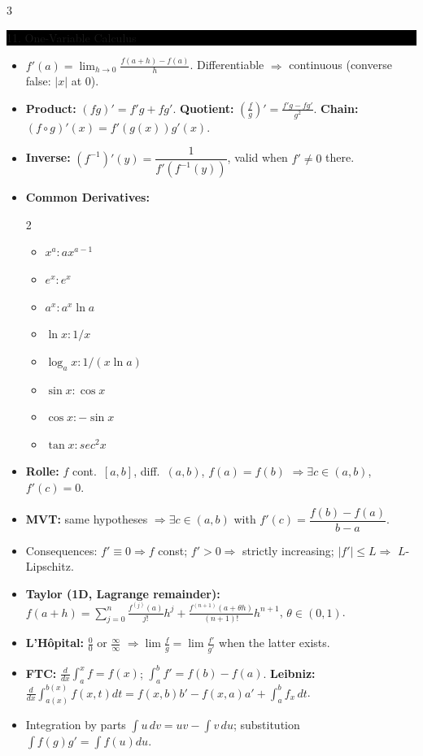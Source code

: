 \documentclass[8pt,letterpaper]{article}
\makeatletter
\newcommand{\sect}[1]{%
  \vspace{2.2pt}%
  \noindent\colorbox{black}{\parbox{\dimexpr\linewidth-2\fboxsep}{%
    \color{white}\bfseries\scshape\fontsize{6.4}{7.4}\selectfont
    \hyphenpenalty=10000\exhyphenpenalty=10000\raggedright #1}}%
  \vspace{1.4pt}\par\nopagebreak\@afterheading}
\newenvironment{tl}
  {\begin{itemize}[leftmargin=6pt,itemsep=0.3pt,topsep=1pt,parsep=0pt,
                   partopsep=0pt,label=\textcolor{gray}{\tiny$\bullet$}]}
  {\end{itemize}}
\makeatother
\begin{document}
\begin{multicols}{3}
\sect{11. One-Variable Calculus}
\begin{tl}
\item $f'(a)=\lim_{h\to0}\frac{f(a+h)-f(a)}{h}$. Differentiable $\Rightarrow$ continuous (converse false: $|x|$ at $0$).
\item \textbf{Product:} $(fg)'=f'g+fg'$. \textbf{Quotient:} $\left(\frac fg\right)'=\frac{f'g-fg'}{g^2}$. \textbf{Chain:} $(f\circ g)'(x)=f'(g(x))g'(x)$.
\item \textbf{Inverse:} $(f^{-1})'(y)=\dfrac{1}{f'(f^{-1}(y))}$, valid when $f'\ne0$ there.
\item \textbf{Common Derivatives:}
{\setlength{\multicolsep}{1pt} %
\begin{multicols}{2}
\begin{itemize}
     \item $x^a: ax^{a-1}$
     \item $e^x: e^x$
     \item $a^x: a^x\ln a$
     \item $\ln x: 1/x$
     \item $\log_a x: 1/(x\ln a)$
     \item $\sin x: \cos x$
     \item $\cos x: -\sin x$
     \item $\tan x: sec^{2}x$ 
\end{itemize}
\end{multicols}}
    
\item \textbf{Rolle:} $f$ cont.\ $[a,b]$, diff.\ $(a,b)$, $f(a)=f(b)$ $\Rightarrow\exists c\in(a,b)$, $f'(c)=0$.
\item \textbf{MVT:} same hypotheses $\Rightarrow\exists c\in(a,b)$ with $f'(c)=\dfrac{f(b)-f(a)}{b-a}$.
\item Consequences: $f'\equiv0\Rightarrow f$ const; $f'>0\Rightarrow$ strictly increasing; $|f'|\le L\Rightarrow$ $L$-Lipschitz.
\item \textbf{Taylor (1D, Lagrange remainder):} $f(a+h)=\sum_{j=0}^{n}\frac{f^{(j)}(a)}{j!}h^j+\frac{f^{(n+1)}(a+\theta h)}{(n+1)!}h^{n+1}$, $\theta\in(0,1)$.
\item \textbf{L'H\^opital:} $\frac00$ or $\frac\infty\infty$ $\Rightarrow\lim\frac fg=\lim\frac{f'}{g'}$ when the latter exists.
\item \textbf{FTC:} $\frac{d}{dx}\int_a^xf=f(x)$; $\int_a^bf'=f(b)-f(a)$. \textbf{Leibniz:} $\frac{d}{dx}\int_{a(x)}^{b(x)}f(x,t)dt=f(x,b)b'-f(x,a)a'+\int_a^b f_x\,dt$.
\item Integration by parts $\int u\,dv=uv-\int v\,du$; substitution $\int f(g)g'=\int f(u)du$.
\end{tl}


\end{multicols}
\end{document}
